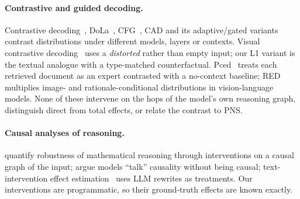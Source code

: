 \documentclass[11pt]{article}
\begin{document}
\paragraph{Contrastive and guided decoding.} Contrastive decoding~\citep{li2023contrastive,
obrien2023cdreasoning}, DoLa~\citep{chuang2024dola}, CFG~\citep{sanchez2024cfg}, CAD and its
adaptive/gated variants~\citep{shi2024cad,wang2025adacad,tao2026nwcad} contrast distributions under
different models, layers or contexts. Visual contrastive decoding~\citep{leng2024vcd} uses a
\emph{distorted} rather than empty input; our L1 variant is the textual analogue with a
type-matched counterfactual. Pced~\citep{corallo2026pced} treats each retrieved document as an
expert contrasted with a no-context baseline; RED~\citep{yamaguchi2026red} multiplies
image- and rationale-conditional distributions in vision-language models. None of these intervene on
the hops of the model's own reasoning graph, distinguish direct from total effects, or relate the
contrast to PNS.

\paragraph{Causal analyses of reasoning.} \citet{stolfo2023causal} quantify robustness of
mathematical reasoning through interventions on a causal graph of the input;
\citet{zecevic2023parrots} argue models ``talk'' causality without being causal; text-intervention
effect estimation~\citep{guo2024causaldann} uses LLM rewrites as treatments. Our interventions are
programmatic, so their ground-truth effects are known exactly.
\end{document}
